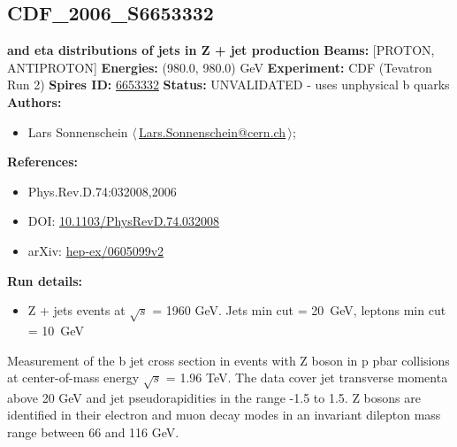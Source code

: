 \subsection[CDF\_2006\_S6653332]{CDF\_2006\_S6653332\,\cite{Abulencia:2006ce}}
\textbf{\pT and eta distributions of jets in Z + jet production}\newline
\textbf{Beams:} [PROTON, ANTIPROTON] \newline
\textbf{Energies:} (980.0, 980.0) GeV \newline
\textbf{Experiment:} CDF (Tevatron Run 2) \newline
\textbf{Spires ID:} \href{http://www.slac.stanford.edu/spires/find/hep/www?rawcmd=key+6653332}{6653332}\newline
\textbf{Status:} UNVALIDATED - uses unphysical b quarks\newline
\textbf{Authors:}
\begin{itemize}
  \item Lars Sonnenschein $\langle\,$\href{mailto:Lars.Sonnenschein@cern.ch}{Lars.Sonnenschein@cern.ch}$\,\rangle$;
\end{itemize}
\textbf{References:}
\begin{itemize}
  \item Phys.Rev.D.74:032008,2006
  \item DOI: \href{http://dx.doi.org/10.1103/PhysRevD.74.032008}{10.1103/PhysRevD.74.032008}
  \item arXiv: \href{http://arxiv.org/abs/hep-ex/0605099v2}{hep-ex/0605099v2}
\end{itemize}
\textbf{Run details:}
\begin{itemize}

  \item Z + jets events at \ensuremath{\sqrt{s}} = 1960 GeV. Jets min \pT cut = 20~GeV, leptons min \pT cut = 10~GeV\end{itemize}

\noindent Measurement of the b jet cross section in events with Z boson in p pbar collisions at center-of-mass energy \ensuremath{\sqrt{s}} = 1.96 TeV. The data cover jet transverse momenta above 20 GeV and jet pseudorapidities in the range -1.5 to 1.5. Z bosons are identified in their electron and muon decay modes in an invariant dilepton mass range between 66 and 116 GeV.

\clearpage


\clearpage

